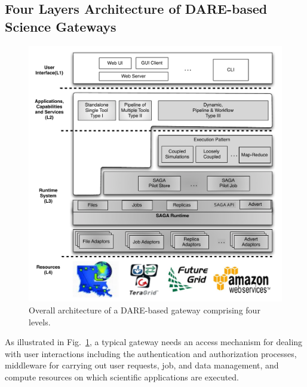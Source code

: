 \documentclass[]{svjour3}
\begin{document}
\subsection{Four Layers Architecture of DARE-based Science Gateways}


\begin{figure}
  \centering
  \includegraphics[scale=0.55]{figures/DARE-gateway-arch.pdf}
  \caption{\small {} Overall architecture of a DARE-based gateway comprising four levels. %
  }
  \label{fig:dare-arch} 
\end{figure}


As illustrated in Fig.~\ref{fig:dare-arch}, a typical gateway needs an access mechanism for dealing with user 
interactions including the authentication and authorization processes, middleware for carrying out user requests, job, 
and data management, and compute resources on which scientific applications are executed. 
\end{document}
